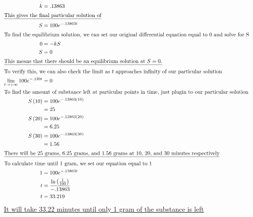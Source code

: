 \documentclass[12pt]{article}
\begin{document}
\begin{align}
  k                                  & =.13863                                        \\
  \intertext{\underline{This gives the final particular solution of}}
  S                                  & =100e^{-.13863t}                               \\
  \intertext{To find the equilibrium solution, we can set our original differential equation equal to 0 and solve for S}
  0                                  & =-kS                                           \\
  S                                  & =0                                             \\
  \intertext{\underline{This means that there should be an equilibrium solution at $S=0$.}}
  \intertext{To verify this, we can also check the limit as $t$ approaches infinity of our particular solution}
  \lim_{t \to +\infty} 100e^{-.139t} & = 0                                            \\
  \intertext{To find the amount of substance left at particular points in time, just plugin to our particular solution}
  S\left(10\right)                   & =100e^{-.13863\left(10\right)}                 \\
                                     & =25                                            \\
  S\left(20\right)                   & =100e^{-.13863\left(20\right)}                 \\
                                     & =6.25                                          \\
  S\left(30\right)                   & =100e^{-.13863\left(30\right)}                 \\
                                     & =1.56                                          \\
  \intertext{\underline{There will be 25 grams, 6.25 grams, and 1.56 grams at 10, 20, and 30 minutes respectively}}
  \intertext{To calculate time until 1 gram, we set our equation equal to 1}
  1                                  & =100e^{-.13863t}                               \\
  t                                  & =\frac{\ln\left(\frac{1}{100}\right)}{-.13863} \\
  t                                  & =33.219
\end{align}
\underline{It will take 33.22 minutes until only 1 gram of the substance is left}
\end{document}
